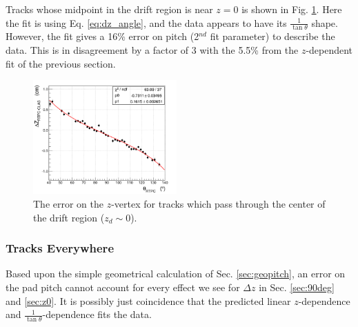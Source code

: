 \documentclass[amsmath,amssymb,notitlepage,11pt]{revtex4-1}
\begin{document}
Tracks whose midpoint in the drift region is near $z=0$ is shown in Fig. \ref{fig:thetadz_0cm}.  
Here the fit is using Eq. \ref{eq:dz_angle}, and the data appears to have its $\frac{1}{\tan\theta}$ shape.  However, the fit gives a 16\% error on pitch (2$^{nd}$ fit parameter) to describe the data.  This is in disagreement by a factor of 3 with the 5.5\% from the $z$-dependent fit of the previous section.
\begin{figure}[htbp]\centering
    \includegraphics[width=0.49\textwidth]{pics/dztheta_zhit0_fit_small.png}
    \caption{The error on the $z$-vertex for tracks which pass through the center of the drift region ($z_d\sim0$).\label{fig:thetadz_0cm}}
\end{figure}
\subsubsection{Tracks Everywhere}
Based upon the simple geometrical calculation of Sec. \ref{sec:geopitch}, an error on the pad pitch cannot account for every effect we see for $\Delta z$ in Sec. \ref{sec:90deg} and \ref{sec:z0}.  It is possibly just coincidence that the predicted linear $z$-dependence and $\frac{1}{\tan\theta}$-dependence fits the data.  
\end{document}
